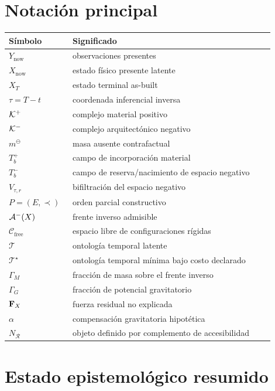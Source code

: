 
\appendix

\section{Notación principal}

\begin{longtable}{p{0.20\linewidth}p{0.70\linewidth}}
\toprule
Símbolo & Significado \\
\midrule
\(Y_{\mathrm{now}}\) & observaciones presentes \\
\(X_{\mathrm{now}}\) & estado físico presente latente \\
\(X_T\) & estado terminal as-built \\
\(\tau=T-t\) & coordenada inferencial inversa \\
\(\mathcal K^{+}\) & complejo material positivo \\
\(\mathcal K^{-}\) & complejo arquitectónico negativo \\
\(m^\ominus\) & masa ausente contrafactual \\
\(T_b^+\) & campo de incorporación material \\
\(T_b^-\) & campo de reserva/nacimiento de espacio negativo \\
\(V_{\tau,r}\) & bifiltración del espacio negativo \\
\(P=(E,\prec)\) & orden parcial constructivo \\
\(\mathcal A^{-}(X)\) & frente inverso admisible \\
\(\mathcal C_{\mathrm{free}}\) & espacio libre de configuraciones rígidas \\
\(\mathcal T\) & ontología temporal latente \\
\(\mathcal T^\star\) & ontología temporal mínima bajo costo declarado \\
\(\Gamma_M\) & fracción de masa sobre el frente inverso \\
\(\Gamma_G\) & fracción de potencial gravitatorio \\
\(\mathbf F_X\) & fuerza residual no explicada \\
\(\alpha\) & compensación gravitatoria hipotética \\
\(N_{\mathcal R}\) & objeto definido por complemento de accesibilidad \\
\bottomrule
\end{longtable}

\section{Estado epistemológico resumido}

